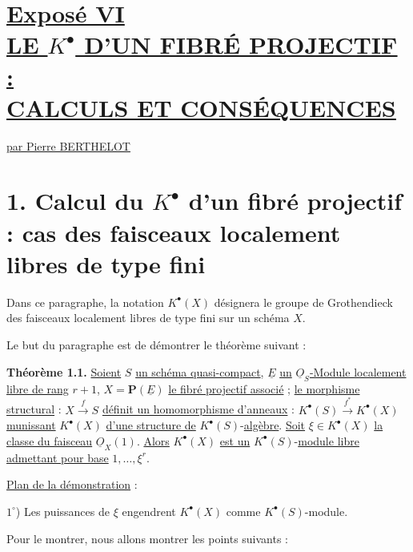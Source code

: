 
\section*{\underline{Exposé VI}\\[3pt] \underline{\underline{LE \(K^{\bullet}\) D'UN FIBRÉ PROJECTIF :}}\\[3pt] \underline{\underline{CALCULS ET CONSÉQUENCES}}}
\renewcommand{\Sym}{\mathbf{S}}
\renewcommand{\Projz}{\underline{\operatorname{Proj}}_0}
\begin{center}
\underline{par Pierre BERTHELOT}
\end{center}

\section*{1. Calcul du \(K^{\bullet}\) d'un fibré projectif : cas des faisceaux localement libres de type fini}

Dans ce paragraphe, la notation \(K^{\bullet}(X)\) désignera le groupe de Grothendieck des faisceaux localement libres de type fini sur un schéma \(X\).

Le but du paragraphe est de démontrer le théorème suivant :

\textbf{Théorème 1.1.} \uline{Soient} \(S\) \uline{un schéma quasi-compact}, \(\underline{E}\) \uline{un} \(\underline{O}_S\)\uline{-Module localement libre de rang} \(r+1\), \(X=\mathbf P(\underline{E})\) \uline{le fibré projectif associé} ; \uline{le morphisme structural} : \(X\xrightarrow{f}S\) \uline{définit un homomorphisme d'anneaux} : \(K^{\bullet}(S) \xrightarrow{f^*} K^{\bullet}(X)\) \uline{munissant} \(K^{\bullet}(X)\) \uline{d'une structure de} \(K^{\bullet}(S)\)-\uline{algèbre}. \uline{Soit} \(\xi\in K^{\bullet}(X)\) \uline{la classe du faisceau} \(\underline{O}_X(1)\). \uline{Alors} \(K^{\bullet}(X)\) \uline{est un} \(K^{\bullet}(S)\)-\uline{module libre admettant pour base} \(1,\ldots,\xi^r\).

\uline{Plan de la démonstration} :

\(1^\circ\)) Les puissances de \(\xi\) engendrent \(K^{\bullet}(X)\) comme \(K^{\bullet}(S)\)-module.

Pour le montrer, nous allons montrer les points suivants :

